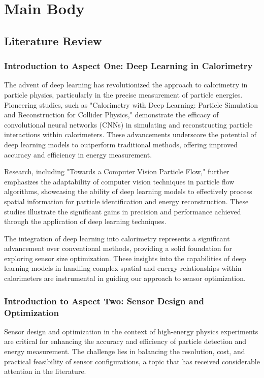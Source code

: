 \documentclass[conference]{IEEEtran}
\begin{document}
\section{Main Body}

\subsection{Literature Review}

\subsubsection{Introduction to Aspect One: Deep Learning in Calorimetry}

The advent of deep learning has revolutionized the approach to calorimetry in particle physics, particularly in the precise measurement of particle energies. Pioneering studies, such as "Calorimetry with Deep Learning: Particle Simulation and Reconstruction for Collider Physics," demonstrate the efficacy of convolutional neural networks (CNNs) in simulating and reconstructing particle interactions within calorimeters. These advancements underscore the potential of deep learning models to outperform traditional methods, offering improved accuracy and efficiency in energy measurement.

Research, including "Towards a Computer Vision Particle Flow," further emphasizes the adaptability of computer vision techniques in particle flow algorithms, showcasing the ability of deep learning models to effectively process spatial information for particle identification and energy reconstruction. These studies illustrate the significant gains in precision and performance achieved through the application of deep learning techniques.

The integration of deep learning into calorimetry represents a significant advancement over conventional methods, providing a solid foundation for exploring sensor size optimization. These insights into the capabilities of deep learning models in handling complex spatial and energy relationships within calorimeters are instrumental in guiding our approach to sensor optimization.

\subsubsection{Introduction to Aspect Two: Sensor Design and Optimization}

Sensor design and optimization in the context of high-energy physics experiments are critical for enhancing the accuracy and efficiency of particle detection and energy measurement. The challenge lies in balancing the resolution, cost, and practical feasibility of sensor configurations, a topic that has received considerable attention in the literature.
\end{document}
